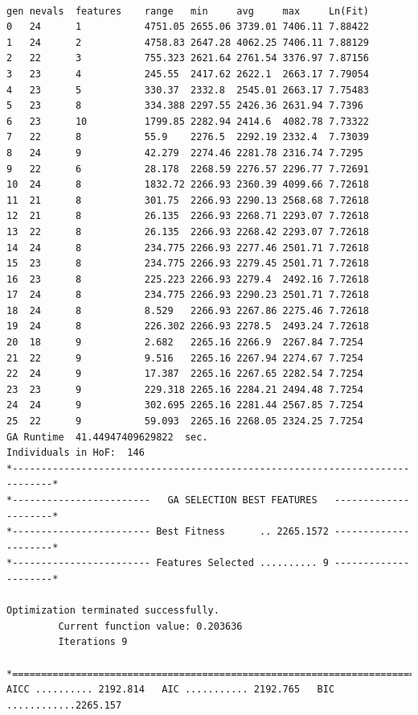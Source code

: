 \documentclass[12pt]{article}
\begin{document}
\begin{verbatim}
 
gen	nevals	features	range  	min    	avg    	max    	Ln(Fit)
0  	24    	1       	4751.05	2655.06	3739.01	7406.11	7.88422
1  	24    	2       	4758.83	2647.28	4062.25	7406.11	7.88129
2  	22    	3       	755.323	2621.64	2761.54	3376.97	7.87156
3  	23    	4       	245.55 	2417.62	2622.1 	2663.17	7.79054
4  	23    	5       	330.37 	2332.8 	2545.01	2663.17	7.75483
5  	23    	8       	334.388	2297.55	2426.36	2631.94	7.7396 
6  	23    	10      	1799.85	2282.94	2414.6 	4082.78	7.73322
7  	22    	8       	55.9   	2276.5 	2292.19	2332.4 	7.73039
8  	24    	9       	42.279 	2274.46	2281.78	2316.74	7.7295 
9  	22    	6       	28.178 	2268.59	2276.57	2296.77	7.72691
10 	24    	8       	1832.72	2266.93	2360.39	4099.66	7.72618
11 	21    	8       	301.75 	2266.93	2290.13	2568.68	7.72618
12 	21    	8       	26.135 	2266.93	2268.71	2293.07	7.72618
13 	22    	8       	26.135 	2266.93	2268.42	2293.07	7.72618
14 	24    	8       	234.775	2266.93	2277.46	2501.71	7.72618
15 	23    	8       	234.775	2266.93	2279.45	2501.71	7.72618
16 	23    	8       	225.223	2266.93	2279.4 	2492.16	7.72618
17 	24    	8       	234.775	2266.93	2290.23	2501.71	7.72618
18 	24    	8       	8.529  	2266.93	2267.86	2275.46	7.72618
19 	24    	8       	226.302	2266.93	2278.5 	2493.24	7.72618
20 	18    	9       	2.682  	2265.16	2266.9 	2267.84	7.7254 
21 	22    	9       	9.516  	2265.16	2267.94	2274.67	7.7254 
22 	24    	9       	17.387 	2265.16	2267.65	2282.54	7.7254 
23 	23    	9       	229.318	2265.16	2284.21	2494.48	7.7254 
24 	24    	9       	302.695	2265.16	2281.44	2567.85	7.7254 
25 	22    	9       	59.093 	2265.16	2268.05	2324.25	7.7254 
GA Runtime  41.44947409629822  sec.
Individuals in HoF:  146
*-----------------------------------------------------------------------------*
*------------------------   GA SELECTION BEST FEATURES   ---------------------*
*------------------------ Best Fitness      .. 2265.1572 ---------------------*
*------------------------ Features Selected .......... 9 ---------------------*

Optimization terminated successfully.
         Current function value: 0.203636
         Iterations 9

*=============================================================================*
AICC .......... 2192.814   AIC ........... 2192.765   BIC ............2265.157


\end{verbatim}
\end{document}
